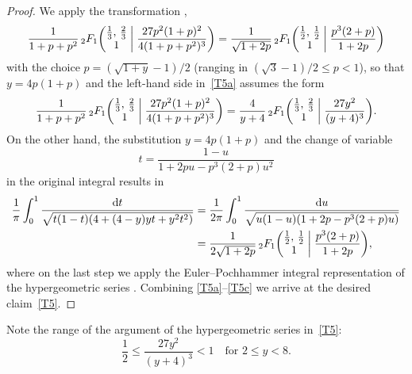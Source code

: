 \documentclass[12pt,reqno]{amsart}
\theoremstyle{remark}
\begin{document}
\begin{proof}
We apply the transformation \cite[p.~112, Theorem~5.6]{Be5},
\begin{equation}
\frac1{1+p+p^2}\,{}_2F_1\biggl(\begin{matrix} \frac13, \, \frac23 \\
1 \end{matrix}\biggm| \frac{27p^2(1+p)^2}{4(1+p+p^2)^3} \biggr)
=\frac1{\sqrt{1+2p}}\,{}_2F_1\biggl(\begin{matrix} \frac12, \, \frac12 \\
1 \end{matrix}\biggm| \frac{p^3(2+p)}{1+2p} \biggr)
\label{T5a}
\end{equation}
with the choice $p=(\sqrt{1+y}-1)/2$ (ranging in $(\sqrt3-1)/2\le p<1$), so that $y=4p(1+p)$
and the left-hand side in~\eqref{T5a} assumes the form
\begin{equation}
\frac1{1+p+p^2}\,{}_2F_1\biggl(\begin{matrix} \frac13, \, \frac23 \\
1 \end{matrix}\biggm| \frac{27p^2(1+p)^2}{4(1+p+p^2)^3} \biggr)
=\frac4{y+4}\,{}_2F_1\biggl(\begin{matrix} \frac13, \, \frac23 \\
1 \end{matrix}\biggm| \frac{27y^2}{(y+4)^3} \biggr).
\label{T5b}
\end{equation}
On the other hand, the substitution $y=4p(1+p)$ and the change of variable
$$
t=\frac{1-u}{1+2pu-p^3(2+p)u^2}
$$
in the original integral results in
\begin{align}
\frac1\pi\int_0^1\frac{{{\mathrm d}} t}{\sqrt{t(1-t)(4+(4-y)yt+y^2t^2)}}
&=\frac1{2\pi}\int_0^1\frac{{{\mathrm d}} u}{\sqrt{u(1-u)(1+2p-p^3(2+p)u)}}
\notag\\
&=\frac1{2\sqrt{1+2p}}\,{}_2F_1\biggl(\begin{matrix} \frac12, \, \frac12 \\
1 \end{matrix}\biggm| \frac{p^3(2+p)}{1+2p} \biggr),
\label{T5c}
\end{align}
where on the last step we apply the Euler--Pochhammer integral representation
of the hypergeometric series \cite[equation (1.6.6)]{Slater}. Combining \eqref{T5a}--\eqref{T5c}
we arrive at the desired claim~\eqref{T5}.
\end{proof}

Note the range of the argument of the hypergeometric series in~\eqref{T5}:
$$
\frac12\le\frac{27y^2}{(y+4)^3}<1
\quad\text{for $2\le y<8$}.
$$
\end{document}
